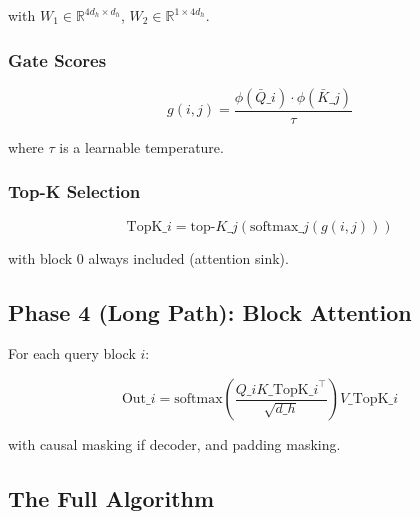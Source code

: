 with $W_1 \in \mathbb{R}^{4 d_h \times d_h}$, $W_2 \in \mathbb{R}^{1 \times 4 d_h}$.

\subsubsection{Gate Scores}

\[
g(i, j) = \frac{\phi(\bar{Q}\_i) \cdot \phi(\bar{K}\_j)}{\tau}
\tag{4.6}
\]

where $\tau$ is a learnable temperature.

\subsubsection{Top-K Selection}

\[
\text{TopK}\_i = \text{top-}K\_{j}(\text{softmax}\_j(g(i, j)))
\tag{4.7}
\]

with block 0 always included (attention sink).

\subsection{Phase 4 (Long Path): Block Attention}

For each query block $i$:

\[
\text{Out}\_i = \text{softmax}\!\left(\frac{Q\_i K\_{\text{TopK}\_i}^\top}{\sqrt{d\_h}}\right) V\_{\text{TopK}\_i}
\tag{4.8}
\]

with causal masking if decoder, and padding masking.

\subsection{The Full Algorithm}

